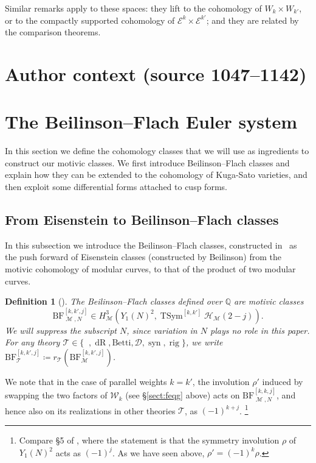 \documentclass[10pt,a4paper]{amsart}
\newcommand{\BF}{\mathrm{BF}}
\newcommand{\Ell}{\mathcal{E}}
\newcommand{\KS}{\mathscr{W}}
\newcommand{\regulator}[1]{r_{#1}}
\DeclareMathOperator{\syn}{syn}
\newcommand{\HS}{\mathscr{H}}
\newcommand{\Q}{\numberset{Q}}
\DeclareMathOperator{\TSym}{TSym}
\DeclareMathOperator{\dR}{dR}
\newcommand{\del}{\mathcal{D}}
\DeclareMathOperator{\et}{\acute{e}t}
\DeclareMathOperator{\mot}{\mathscr{M}}
\DeclareMathOperator{\rig}{rig}
\newcommand{\theory}{\mathcal{T}}
\newcommand{\numberset}{\mathbb}
\newtheorem{definition}{Definition}
\begin{document}
  Similar remarks apply to these spaces: they lift to the cohomology of $W_k \times W_{k'}$, or to the compactly supported cohomology of $\Ell^k \times \Ell^{k'}$; and they are related by the comparison theorems.

\section*{Author context (source 1047--1142)}
\section{The Beilinson--Flach Euler system}

 In this section we define the cohomology classes that we will use as ingredients to construct our motivic classes. We first introduce Beilinson--Flach classes and explain how they can be extended to the cohomology of Kuga-Sato varieties, and then exploit some differential forms attached to cusp forms.

 \subsection{From Eisenstein to Beilinson--Flach classes}

  In this subsection we introduce the Beilinson--Flach classes, constructed in~\cite{leiloefflerzerbes14,KLZ20} as the push forward of Eisenstein classes (constructed by Beilinson) from the motivic cohomology of modular curves, to that of the product of two modular curves.

  \begin{definition}[{\cite[Definition~5.3.1]{KLZ20}}]
   The Beilinson--Flach classes defined over $\Q$ are motivic classes
   \[
    \BF^{[k,k',j]}_{\mot,N} \in H^3_{\mot}(Y_1(N)^2,\TSym^{[k,k']} \HS_{\mot}(2-j)).
   \]
   We will suppress the subscript $N$, since variation in $N$ plays no role in this paper. For any theory $\theory\in\{\et,\dR,\mathrm{Betti},\del,\syn,\rig\}$, we write $\BF^{[k,k',j]}_{\theory} \coloneqq \regulator{\theory}(\BF^{[k,k',j]}_{\mot})$.
  \end{definition}

  We note that in the case of parallel weights $k = k'$, the involution $\rho'$ induced by swapping the two factors of $\KS_k$ (see \S \ref{sect:feqg} above) acts on $\BF^{[k,k,j]}_{\mot,N}$, and hence also on its realizations in other theories $\theory$, as $(-1)^{k + j}$. \footnote{Compare \S 5 of \cite{KLZ17}, where the statement is that the symmetry involution $\rho$ of $Y_1(N)^2$ acts as $(-1)^j$. As we have seen above, $\rho' = (-1)^k \rho$.}
\end{document}
